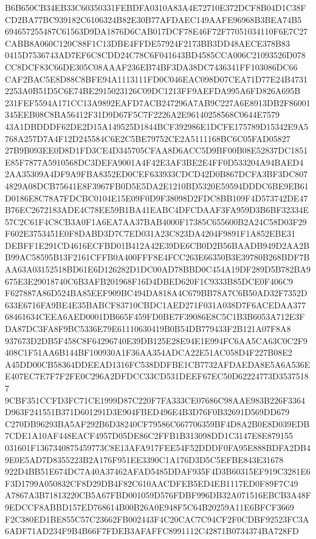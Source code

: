 \documentclass[UTF8,fontset=fandol,zihao=-4,a4paper]{ctexart}
\begin{document}
{{B6B650CB34EB33C60350331FEBDFA0310A83A4E72710E372DCF8B04D1C38FCD2BA77BC939182C6106324B82E30B77AFDAEC149AAFE96968B3BEA74B5
694657255487C61563D9DA1876D6CAB017DCF78E46F72F77051034110F6E7C27CABB8A060C120C88F1C13DBE4FFDE57924F2173BB3DD48AECE378B83
0415D7536743AD7EF6C8CDD24C78C6F041643BD4585CCA006C21093526D078CC8DCF83C66DE305C08AAAF236EB74BF3DA38DC7436341FF103086DC66
CAF2BAC5E8D88C8BFE94A1113111FD0C046EAC098D07CEA71D77E24B47312253A0B51D5C6E74BE2915023126C09DC1213FF9AEFDA995A6FD826A695B
231FEF5594A171CC13A9892EAFD7ACB247296A7AB9C227A6E8913DB2F86001345EEB08C8BA56412F31D9D67F5C7F2226A2E96140258568C0644E7579
43A1DBDDDF62DE2D15A149525D1844BCF392986E1DCFE175789D15342E9A5768A257D7A4F12D245584C6E2C5BE79752CE2A5111168BC6C05FAD05827
27B9B093EE0D8D1FD3CE4D345705CFAA8D6ACC5D9BF00B08E52837DC1851E85F7877A5910568DC3DEFA9001A4F42E3AF3BE2E4FF0D533204A94BAED4
2AA35309A4DF9A9FBA8352ED0CEF633933CDCD42D0B867DCFA3BF3DC8074829A08DCB75641E8F3967FB0D5E5DA2E1210BD5320E59594DDDC6BE9EB61
D0186E8C78A7FDCBC0104E15E09F0D9F38098D2FDC8BB109F4D573742DE47B76EC2672183ADE4C78EE59B1BA41EABC4DFCDAAF3FA959D3B6BF32334E
57C2C61F4C8CB3A0F1A6EA7AA37BAB4000F17385C655600B2A24C58D03F29F602E3753451E0F8DABD3D7C7ED031A23C823DA4204F9891F1A852EBE31
DEBFF1E291CD4616ECFBD01B412A42E39DE6CB0D2B56BAADB949D2AA2BB99AC58595B13F2161CFFB0A400FFF8E4FCC263E66350B3E39780B268BDF7B
AA63A03152518BD61E6D126282D1DC00AD78BBD0C454A19DF289D5B782BA9675E3E29018740C6B3AFB201968F16D4DBED620F1C9333B85DCE0F406C9
F627887A86D524BA85EEF909BC494DA818A4C679BB78A7C6B50AD32F7352D633E6716FA9BE4E35BABCF83710CBDC1AED271F031A038D7F6ACEDAA377
68461634CEEA6AED0001DB665F459FD0BE7F39086E8C5C1B3B6053A712E3FDA87DC3FA8F9BC5336E79E61110630419B0B54DB779433F2B121A07F8A8
937673D2DB5F458C8F64296740E39DB125E28E94E1E994FC6AA5CA63C0C2F9408C1F51AA6B144BF100930A1F36AA354ADCA22E51AC058D4F227B08E2
A45DD00CB58364DDEEAD1316FC538DDFBE1CB7732AFDAEDA8E5A6A536EE407EC7E7F7F2FE0C296A2DFDCC33CD531DEEF67EC50D62224773D35375187
9CBF351CCFD3FC71CE1999D87C220F7FA333CE07686C98AAE983B226F3364D963F241551B371D601291D3E904FBED496E4B3D76F0B32691D569DD679
C270DB96293BA5AF292B6D38240CF79586C667706359BF4D8A2B0E8D039EDB7CDE1A10AF448EACF4957D05DE86C2FFB1B313098DD1C3147E8E879155
031601F1367340875459773C8E13AFA917FEE54F52DDDF0FA95E888BDFA2DB49E0E5AD7D8355223B2A176F951EE3390C1A176D3D5C5EFBE843E31678
922D4BB51E674DC7A40A37462AFAD5485DDAF935F4D3B60315EF919C3281E6F3D1799A050832CF8D29DB4F82C610AACDFEB5ED4EB1117ED0F89F7C49
A7867A3B71813220CB5A67FBD001059D576FDBF996DB32A071516EBCB3A48F9EDCCF8ABBD157ED768614B00B26A0E948F5C64B20259A11E6BFCF3669
F2C380ED1BE855C57C23662FB002443F4C20CAC7C94CF2F0CDBF92523FC3A6ADF71AD234F9B4B66F7FDEB3AFAFFC8991112C42871B0734374BA728FD
}}
\end{document}
